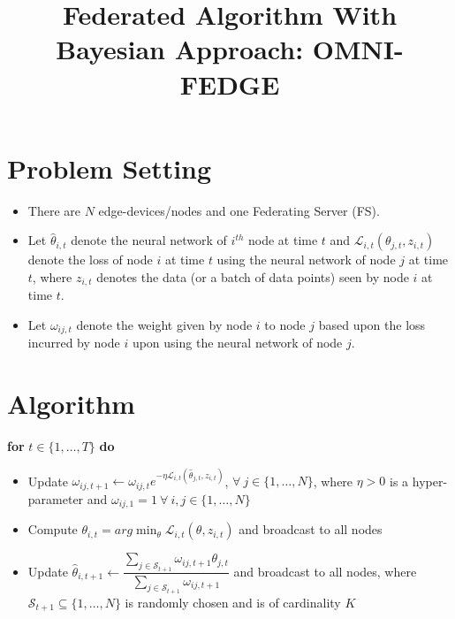 \documentclass{article}
\title{Federated Algorithm With Bayesian Approach: OMNI-FEDGE}
\theoremstyle{definition}
\begin{document}
    \section{Problem Setting} \label{sec:ps}
    \begin{itemize}
            \item There are $N$ edge-devices/nodes and one Federating Server (FS). 
            \item Let $\hat{\theta}_{i,t}$ denote the neural network of $i^{th}$ node at time $t$ and $\mathcal{L}_{i,t}(\theta_{j,t},z_{i,t})$ denote the loss of node $i$ at time $t$ using the neural network of node $j$ at time $t$, where $z_{i,t}$ denotes the data (or a batch of data points) seen by node $i$ at time $t$. 
            \item Let $\omega_{ij,t}$ denote the weight given by node $i$ to node $j$ based upon the loss incurred by node $i$ upon using the neural network of node $j$.
    \end{itemize}
    \section{Algorithm} \label{sec:algo}
    \textbf{for} $t\in\{1,\ldots,T\}$ \textbf{do}
    \begin{itemize}
            \item Update $\omega_{ij,t+1} \leftarrow \omega_{ij,t}e^{-\eta\mathcal{L}_{i,t}(\hat{\theta}_{j,t},z_{i,t})}$, $\forall \ j\in\{1,\ldots,N\}$, where $\eta>0$ is a hyper-parameter and $\omega_{ij,1}=1\ \forall\ i,j\in\{1,\ldots,N\}$
            \item Compute $\theta_{i,t} = arg\min_{\theta}\mathcal{L}_{i,t}(\theta,z_{i,t})$ and broadcast to all nodes
            \item Update $\hat{\theta}_{i,t+1} \leftarrow \dfrac{\sum_{j\in\mathcal{S}_{t+1}}\omega_{ij,t+1}\theta_{j,t}}{\sum_{j\in\mathcal{S}_{t+1}}\omega_{ij,t+1}}$ and broadcast to all nodes, where $\mathcal{S}_{t+1}\subseteq\{1,\ldots,N\}$ is randomly chosen and is of cardinality $K$
    \end{itemize}
\end{document}
